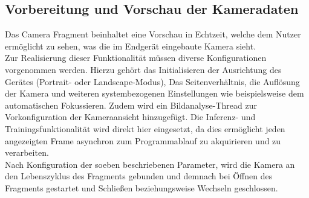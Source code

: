 \documentclass[oneside]{ausarbeitung}
\begin{document}
\subsection{Vorbereitung und Vorschau der Kameradaten}
Das Camera Fragment beinhaltet eine Vorschau in Echtzeit, welche dem Nutzer ermöglicht zu sehen, was die im Endgerät eingebaute Kamera sieht.\\
Zur Realisierung dieser Funktionalität müssen diverse Konfigurationen vorgenommen werden. Hierzu gehört das Initialisieren der Ausrichtung des Gerätes (Portrait- oder Landscape-Modus), Das Seitenverhältnis, die Auflösung der Kamera und weiteren systembezogenen Einstellungen wie beispielsweise dem automatischen Fokussieren. Zudem wird ein Bildanalyse-Thread zur Vorkonfiguration der Kameraansicht hinzugefügt. Die Inferenz- und Trainingsfunktionalität wird direkt hier eingesetzt, da dies ermöglicht jeden angezeigten Frame asynchron zum Programmablauf zu akquirieren und zu verarbeiten. \\
Nach Konfiguration der soeben beschriebenen Parameter, wird die Kamera an den Lebenszyklus des Fragments gebunden und demnach bei Öffnen des Fragments gestartet und Schließen beziehungsweise Wechseln geschlossen.\\
\end{document}
